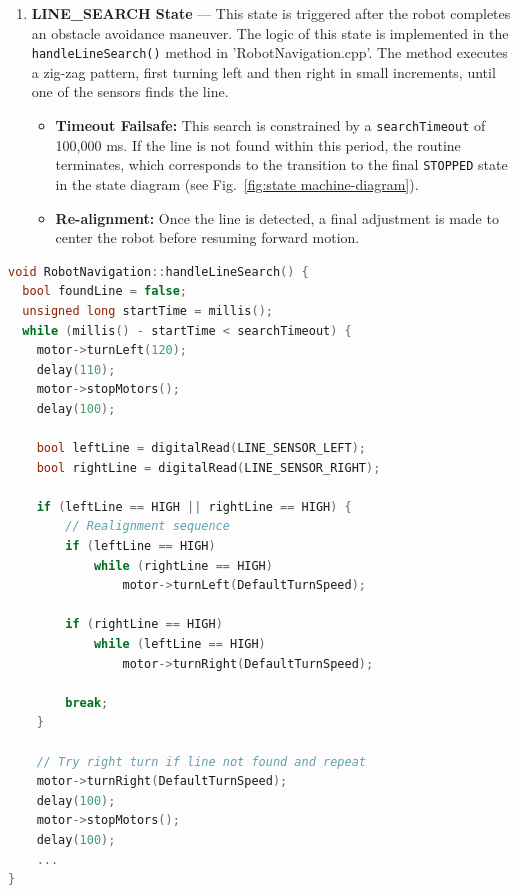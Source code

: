 \documentclass[conference]{IEEEtran}
\begin{document}
\begin{enumerate}[label=\alph*)]
\begin{lstlisting}[language=C++, caption=Line Correction Logic]
case RIGHT: // The RIGHT case is symmetric
...
\end{lstlisting}

\item \textbf{LINE\_SEARCH State} — This state is triggered after the robot completes an obstacle avoidance maneuver. The logic of this state is implemented in the \texttt{handleLineSearch()} method in 'RobotNavigation.cpp'. The method executes a zig-zag pattern, first turning left and then right in small increments, until one of the sensors finds the line.

\begin{itemize}
    \item \textbf{Timeout Failsafe:} This search is constrained by a \texttt{searchTimeout} of 100,000 ms. If the line is not found within this period, the routine terminates, which corresponds to the transition to the final \texttt{STOPPED} state in the state diagram (see Fig.~\ref{fig:state machine-diagram}).
    \item \textbf{Re-alignment:} Once the line is detected, a final adjustment is made to center the robot before resuming forward motion.
\end{itemize}

\end{enumerate}

\begin{lstlisting}[language=C++, caption=Excerpt from the Line Search Sequence]
void RobotNavigation::handleLineSearch() {
  bool foundLine = false;
  unsigned long startTime = millis();
  while (millis() - startTime < searchTimeout) {
    motor->turnLeft(120);
    delay(110);
    motor->stopMotors();
    delay(100);

    bool leftLine = digitalRead(LINE_SENSOR_LEFT);
    bool rightLine = digitalRead(LINE_SENSOR_RIGHT);

    if (leftLine == HIGH || rightLine == HIGH) {
        // Realignment sequence
        if (leftLine == HIGH)
            while (rightLine == HIGH)
                motor->turnLeft(DefaultTurnSpeed);

        if (rightLine == HIGH)
            while (leftLine == HIGH)
                motor->turnRight(DefaultTurnSpeed);

        break;
    }

    // Try right turn if line not found and repeat
    motor->turnRight(DefaultTurnSpeed);
    delay(100);
    motor->stopMotors();
    delay(100);
    ...
}
\end{lstlisting}
\end{document}
